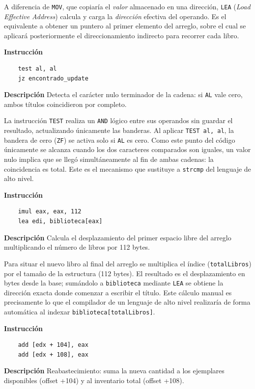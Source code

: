 \documentclass[a4paper,12pt]{article}
\begin{document}
A diferencia de \texttt{MOV}, que copiaría el \textit{valor} almacenado en una dirección, \texttt{LEA} (\textit{Load Effective Address}) calcula y carga la \textit{dirección} efectiva del operando. Es el equivalente a obtener un puntero al primer elemento del arreglo, sobre el cual se aplicará posteriormente el direccionamiento indirecto para recorrer cada libro.

\begin{instruccionbox}
\textbf{Instrucción}
\begin{lstlisting}
    test al, al
    jz encontrado_update
\end{lstlisting}
\textbf{Descripción}
Detecta el carácter nulo terminador de la cadena: si \texttt{AL} vale cero, ambos títulos coincidieron por completo.
\end{instruccionbox}

La instrucción \texttt{TEST} realiza un \texttt{AND} lógico entre sus operandos sin guardar el resultado, actualizando únicamente las banderas. Al aplicar \texttt{TEST al, al}, la bandera de cero (\texttt{ZF}) se activa solo si \texttt{AL} es cero. Como este punto del código únicamente se alcanza cuando los dos caracteres comparados son iguales, un valor nulo implica que se llegó simultáneamente al fin de ambas cadenas: la coincidencia es total. Este es el mecanismo que sustituye a \texttt{strcmp} del lenguaje de alto nivel.

\begin{instruccionbox}
\textbf{Instrucción}
\begin{lstlisting}
    imul eax, eax, 112
    lea edi, biblioteca[eax]
\end{lstlisting}
\textbf{Descripción}
Calcula el desplazamiento del primer espacio libre del arreglo multiplicando el número de libros por 112 bytes.
\end{instruccionbox}

Para situar el nuevo libro al final del arreglo se multiplica el índice (\texttt{totalLibros}) por el tamaño de la estructura (112 bytes). El resultado es el desplazamiento en bytes desde la base; sumándolo a \texttt{biblioteca} mediante \texttt{LEA} se obtiene la dirección exacta donde comenzar a escribir el título. Este cálculo manual es precisamente lo que el compilador de un lenguaje de alto nivel realizaría de forma automática al indexar \texttt{biblioteca[totalLibros]}.

\begin{instruccionbox}
\textbf{Instrucción}
\begin{lstlisting}
    add [edx + 104], eax
    add [edx + 108], eax
\end{lstlisting}
\textbf{Descripción}
Reabastecimiento: suma la nueva cantidad a los ejemplares disponibles (offset +104) y al inventario total (offset +108).
\end{instruccionbox}
\end{document}
